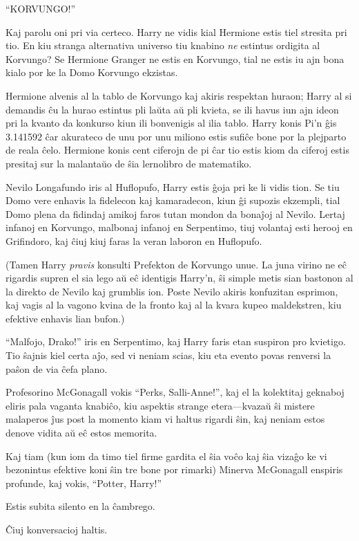 ``KORVUNGO!''

Kaj parolu oni pri via certeco. Harry ne vidis kial Hermione estis
tiel stresita pri tio. En kiu stranga alternativa universo tiu knabino
\emph{ne} estintus ordigita al Korvungo? Se Hermione Granger ne estis
en Korvungo, tial ne estis iu ajn bona kialo por ke la Domo Korvungo
ekzistas.

Hermione alvenis al la tablo de Korvungo kaj akiris respektan huraon;
Harry al si demandis ĉu la hurao estintus pli laŭta aŭ pli kvieta, se
ili havus iun ajn ideon pri la kvanto da konkurso kiun ili bonvenigis
al ilia tablo. Harry konis Pi'n ĝis 3.141592 ĉar akurateco de unu por
unu miliono estis sufiĉe bone por la plejparto de reala ĉelo. Hermione
konis cent ciferojn de pi ĉar tio estis kiom da ciferoj estis presitaj
sur la malantaŭo de ŝia lernolibro de matematiko.

Nevilo Longafundo iris al Huflopufo, Harry estis ĝoja pri ke li vidis
tion. Se tiu Domo vere enhavis la fidelecon kaj kamaradecon, kiun ĝi
supozis ekzempli, tial Domo plena da fidindaj amikoj faros tutan
mondon da bonaĵoj al Nevilo. Lertaj infanoj en Korvungo, malbonaj
infanoj en Serpentimo, tiuj volantaj esti herooj en Grifindoro, kaj
ĉiuj kiuj faras la veran laboron en Huflopufo.

(Tamen Harry \emph{pravis} konsulti Prefekton de Korvungo unue. La
juna virino ne eĉ rigardis supren el sia lego aŭ eĉ identigis Harry'n,
ŝi simple metis sian bastonon al la direkto de Nevilo kaj grumblis
ion. Poste Nevilo akiris konfuzitan esprimon, kaj vagis al la vagono
kvina de la fronto kaj al la kvara kupeo maldekstren, kiu efektive
enhavis lian bufon.)

``Malfojo, Drako!'' iris en Serpentimo, kaj Harry faris etan suspiron
pro kvietigo. Tio ŝajnis kiel certa aĵo, sed vi neniam scias, kiu eta
evento povas renversi la paŝon de via ĉefa plano.

Profesorino McGonagall vokis ``Perks, Salli-Anne!'', kaj el la
kolektitaj geknaboj eliris pala vaganta knabiĉo, kiu aspektis
strange etera—kvazaŭ ŝi mistere malaperos ĵus post la momento kiam vi
haltus rigardi ŝin, kaj neniam estos denove vidita aŭ eĉ estos
memorita.
 
Kaj tiam (kun iom da timo tiel firme gardita el ŝia voĉo kaj ŝia
vizaĝo ke vi bezonintus efektive koni ŝin tre bone por rimarki)
Minerva McGonagall enspiris profunde, kaj vokis, ``Potter, Harry!''

Estis subita silento en la ĉambrego.

Ĉiuj konversacioj haltis.


